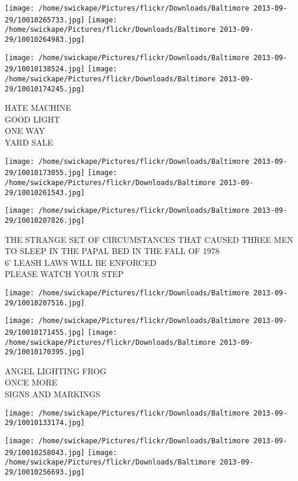 \documentclass[10pt,letterpaper]{article}
\begin{document}
\texttt{[image: /home/swickape/Pictures/flickr/Downloads/Baltimore 2013-09-29/10010265733.jpg]}
\texttt{[image: /home/swickape/Pictures/flickr/Downloads/Baltimore 2013-09-29/10010264983.jpg]}

\texttt{[image: /home/swickape/Pictures/flickr/Downloads/Baltimore 2013-09-29/10010138524.jpg]}
\texttt{[image: /home/swickape/Pictures/flickr/Downloads/Baltimore 2013-09-29/10010174245.jpg]}

HATE MACHINE\\
GOOD LIGHT\\
ONE WAY\\
YARD SALE\\
\pagebreak

\texttt{[image: /home/swickape/Pictures/flickr/Downloads/Baltimore 2013-09-29/10010173055.jpg]}
\texttt{[image: /home/swickape/Pictures/flickr/Downloads/Baltimore 2013-09-29/10010261543.jpg]}

\texttt{[image: /home/swickape/Pictures/flickr/Downloads/Baltimore 2013-09-29/10010207826.jpg]}

THE STRANGE SET OF CIRCUMSTANCES THAT CAUSED THREE MEN TO SLEEP IN THE PAPAL BED IN THE FALL OF 1978\\
6' LEASH LAWS WILL BE ENFORCED\\
PLEASE WATCH YOUR STEP\\
\pagebreak

\texttt{[image: /home/swickape/Pictures/flickr/Downloads/Baltimore 2013-09-29/10010207516.jpg]}

\vspace{0.25in}
\texttt{[image: /home/swickape/Pictures/flickr/Downloads/Baltimore 2013-09-29/10010171455.jpg]}
\texttt{[image: /home/swickape/Pictures/flickr/Downloads/Baltimore 2013-09-29/10010170395.jpg]}

ANGEL LIGHTING FROG\\
ONCE MORE\\
SIGNS AND MARKINGS\\
\pagebreak

\texttt{[image: /home/swickape/Pictures/flickr/Downloads/Baltimore 2013-09-29/10010133174.jpg]}

\vspace{0.25in}
\texttt{[image: /home/swickape/Pictures/flickr/Downloads/Baltimore 2013-09-29/10010258043.jpg]}
\texttt{[image: /home/swickape/Pictures/flickr/Downloads/Baltimore 2013-09-29/10010256693.jpg]}
\end{document}
